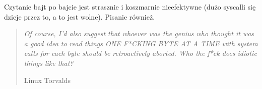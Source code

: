 Czytanie bajt po bajcie jest strasznie i koszmarnie nieefektywne (dużo syscalli się dzieje przez to, a to jest wolne). Pisanie również.

\begin{quote}
	\textit{
		Of course, I'd also suggest that whoever was the genius who thought it
		was a good idea to read things ONE F*CKING BYTE AT A TIME with system
		calls for each byte should be retroactively aborted. Who the f*ck does
		idiotic things like that?}

	Linux Torvalds
\end{quote}